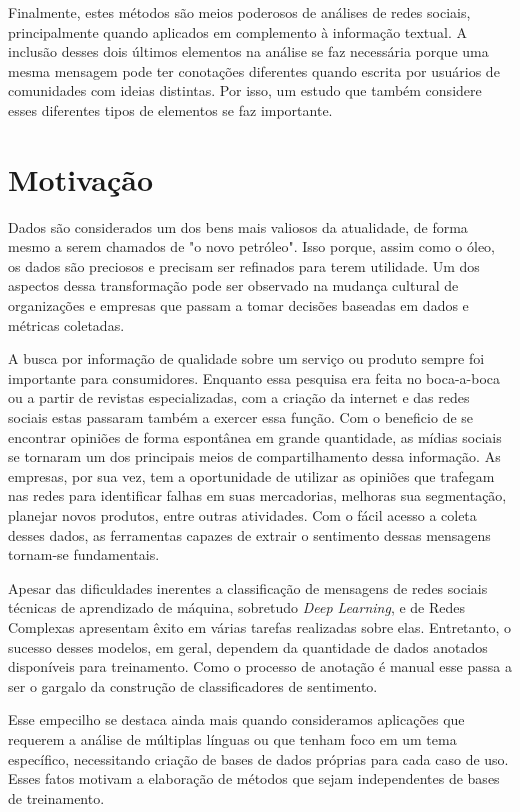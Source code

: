 Finalmente, estes métodos são meios poderosos de análises de redes sociais,
principalmente quando aplicados em complemento à informação textual.
A inclusão desses dois últimos elementos na análise se faz necessária porque uma
mesma mensagem pode ter conotações diferentes quando escrita por usuários de
comunidades com ideias distintas.
Por isso, um estudo que também considere esses diferentes tipos de elementos se
faz importante.

\section{Motivação}

Dados são considerados um dos bens mais valiosos da atualidade, de forma mesmo a
serem chamados de "o novo petróleo".
Isso porque, assim como o óleo, os dados são preciosos e precisam ser refinados
para terem utilidade.
Um dos aspectos dessa transformação pode ser observado na mudança cultural de
organizações e empresas que passam a tomar decisões baseadas em dados e métricas
coletadas.

A busca por informação de qualidade sobre um serviço ou produto sempre foi
importante para consumidores.
Enquanto essa pesquisa era feita no boca-a-boca ou a partir de revistas
especializadas, com a criação da internet e das redes sociais estas passaram
também a exercer essa função.
Com o beneficio de se encontrar opiniões de forma espontânea em grande quantidade,
as mídias sociais se tornaram um dos principais meios de compartilhamento dessa
informação.
As empresas, por sua vez, tem a oportunidade de utilizar as opiniões que
trafegam nas redes para identificar falhas em suas mercadorias, melhoras sua
segmentação, planejar novos produtos, entre outras atividades.
Com o fácil acesso a coleta desses dados, as ferramentas capazes de extrair o
sentimento dessas mensagens tornam-se fundamentais.

Apesar das dificuldades inerentes a classificação de mensagens de redes sociais
técnicas de aprendizado de máquina, sobretudo \textit{Deep Learning}, e de Redes
Complexas apresentam êxito em várias tarefas realizadas sobre elas.
Entretanto, o sucesso desses modelos, em geral, dependem da quantidade de dados
anotados disponíveis para treinamento.
Como o processo de anotação é manual esse passa a ser o gargalo da construção de
classificadores de sentimento.

Esse empecilho se destaca ainda mais quando consideramos aplicações que
requerem a análise de múltiplas línguas ou que tenham foco em um tema
específico, necessitando criação de bases de dados próprias para cada caso de
uso.
Esses fatos motivam a elaboração de métodos que sejam independentes de bases de
treinamento.

